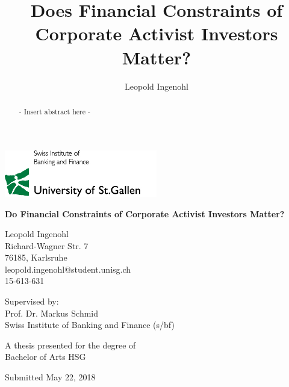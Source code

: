 \documentclass[12pt]{article}
\title{Does Financial Constraints of Corporate Activist Investors Matter?}
\author{Leopold Ingenohl}
\renewcommand{\baselinestretch}{1.5}
\begin{document}
\begin{titlepage}
    \begin{center}
       
        \includegraphics[width=0.5\textwidth]{Logo.jpg}
       
        \vspace*{1.5cm}
		\huge
        \textbf{Do Financial Constraints of Corporate Activist Investors Matter?}

        \vspace{1.5cm}
		\normalsize
        Leopold Ingenohl\\
        Richard-Wagner Str. 7\\
        76185, Karlsruhe\\
        leopold.ingenohl@student.unisg.ch\\
        15-613-631

        \vspace{1.5cm}
        Supervised by:\\
        Prof. Dr. Markus Schmid\\
        Swiss Institute of Banking and Finance (s/bf)\\
        \vfill

        A thesis presented for the degree of\\
        Bachelor of Arts HSG

        \vspace{0.8cm}

        Submitted May 22, 2018

	\end{center}
	
\end{titlepage}

\cleardoublepage
{}
\begin{abstract}
	\centering
	- Insert abstract here -
\end{abstract}

\pagebreak
\renewcommand{\baselinestretch}{1.5}\normalsize
\tableofcontents
\listoftables
\listoffigures
\pagebreak
\renewcommand{\baselinestretch}{1.5}
\end{document}

